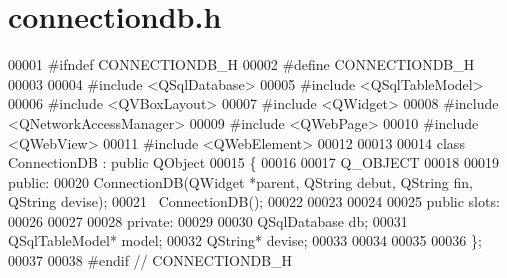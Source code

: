 \section{connectiondb.\-h}

\begin{DoxyCode}
00001 \textcolor{preprocessor}{#ifndef CONNECTIONDB\_H}
00002 \textcolor{preprocessor}{}\textcolor{preprocessor}{#define CONNECTIONDB\_H}
00003 \textcolor{preprocessor}{}
00004 \textcolor{preprocessor}{#include <QSqlDatabase>}
00005 \textcolor{preprocessor}{#include <QSqlTableModel>}
00006 \textcolor{preprocessor}{#include <QVBoxLayout>}
00007 \textcolor{preprocessor}{#include <QWidget>}
00008 \textcolor{preprocessor}{#include <QNetworkAccessManager>}
00009 \textcolor{preprocessor}{#include <QWebPage>}
00010 \textcolor{preprocessor}{#include <QWebView>}
00011 \textcolor{preprocessor}{#include <QWebElement>}
00012 
00013 
00014 \textcolor{keyword}{class }ConnectionDB : \textcolor{keyword}{public} QObject
00015 \{
00016 
00017     Q\_OBJECT
00018 
00019 \textcolor{keyword}{public}:
00020     ConnectionDB(QWidget *parent, QString debut, QString fin, QString devise);
00021     ~ConnectionDB();
00022 
00023 
00024 
00025 \textcolor{keyword}{public} slots:
00026 
00027 
00028 \textcolor{keyword}{private}:
00029 
00030     QSqlDatabase            db;
00031     QSqlTableModel*         model;
00032     QString*                devise;
00033 
00034 
00035 
00036 \};
00037 
00038 \textcolor{preprocessor}{#endif // CONNECTIONDB\_H}
\end{DoxyCode}
